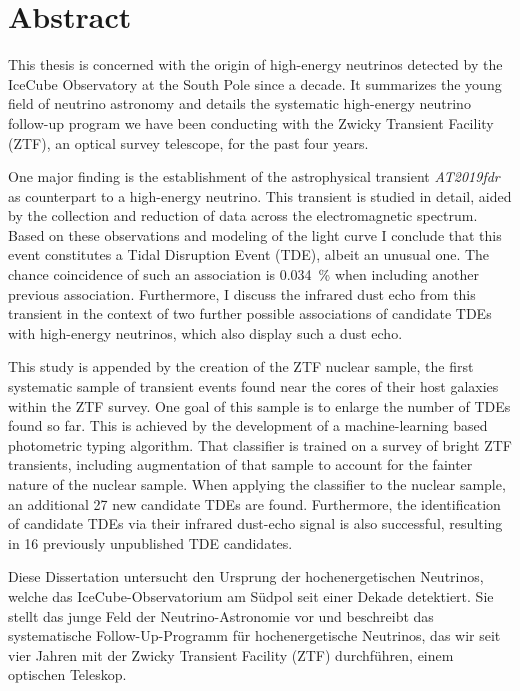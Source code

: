 \chapter*{Abstract}\label{abstract}


This thesis is concerned with the origin of high-energy neutrinos detected by the IceCube Observatory at the South Pole since a decade. It summarizes the young field of neutrino astronomy and details the systematic high-energy neutrino follow-up program we have been conducting with the Zwicky Transient Facility (ZTF), an optical survey telescope, for the past four years.

One major finding is the establishment of the astrophysical transient \textit{AT2019fdr} as counterpart to a high-energy neutrino. This transient is studied in detail, aided by the collection and reduction of data across the electromagnetic spectrum. Based on these observations and modeling of the light curve I conclude that this event constitutes a Tidal Disruption Event (TDE), albeit an unusual one. The chance coincidence of such an association is \SI{0.034}{\percent} when including another previous association. Furthermore, I discuss the infrared dust echo from this transient in the context of two further possible associations of candidate TDEs with high-energy neutrinos, which also display such a dust echo.

This study is appended by the creation of the ZTF nuclear sample, the first systematic sample of transient events found near the cores of their host galaxies within the ZTF survey. One goal of this sample is to enlarge the number of TDEs found so far. This is achieved by the development of a machine-learning based photometric typing algorithm. That classifier is trained on a survey of bright ZTF transients, including augmentation of that sample to account for the fainter nature of the nuclear sample. When applying the classifier to the nuclear sample, an additional 27 new candidate TDEs are found. Furthermore, the identification of candidate TDEs via their infrared dust-echo signal is also successful, resulting in 16 previously unpublished TDE candidates.

\newpage

Diese Dissertation untersucht den Ursprung der hochenergetischen Neutrinos, welche das IceCube-Observatorium am Südpol seit einer Dekade detektiert. Sie stellt das junge Feld der Neutrino-Astronomie vor und beschreibt das systematische Follow-Up-Programm für hochenergetische Neutrinos, das wir seit vier Jahren mit der Zwicky Transient Facility (ZTF) durchführen, einem optischen Teleskop.

